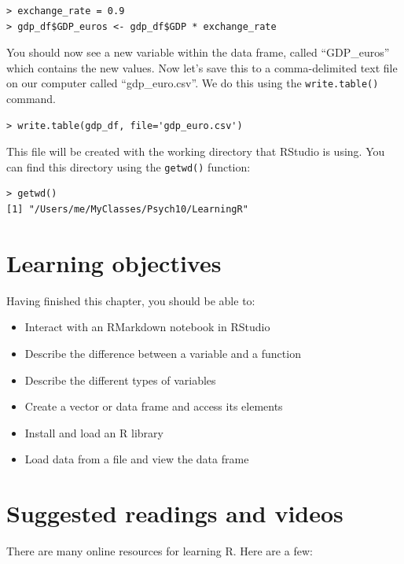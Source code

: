\documentclass[12pt,]{book}
\providecommand{\tightlist}{%
  \setlength{\itemsep}{0pt}\setlength{\parskip}{0pt}}
\begin{document}
\begin{verbatim}
> exchange_rate = 0.9
> gdp_df$GDP_euros <- gdp_df$GDP * exchange_rate
\end{verbatim}

You should now see a new variable within the data frame, called ``GDP\_euros'' which contains the new values. Now let's save this to a comma-delimited text file on our computer called ``gdp\_euro.csv''.
We do this using the \texttt{write.table()} command.

\begin{verbatim}
> write.table(gdp_df, file='gdp_euro.csv')
\end{verbatim}

This file will be created with the working directory that RStudio is using. You can find this directory using the \texttt{getwd()} function:

\begin{verbatim}
> getwd()
[1] "/Users/me/MyClasses/Psych10/LearningR"
\end{verbatim}

\hypertarget{learning-objectives}{%
\section{Learning objectives}\label{learning-objectives}}

Having finished this chapter, you should be able to:

\begin{itemize}
\tightlist
\item
  Interact with an RMarkdown notebook in RStudio
\item
  Describe the difference between a variable and a function
\item
  Describe the different types of variables
\item
  Create a vector or data frame and access its elements
\item
  Install and load an R library
\item
  Load data from a file and view the data frame
\end{itemize}

\hypertarget{suggested-readings-and-videos}{%
\section{Suggested readings and videos}\label{suggested-readings-and-videos}}

There are many online resources for learning R. Here are a few:
\end{document}
